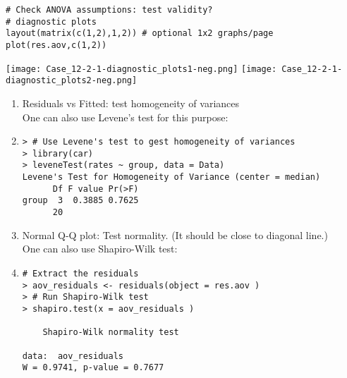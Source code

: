 \begin{frame}[fragile]
\begin{center}
\begin{lstlisting}
# Check ANOVA assumptions: test validity?
# diagnostic plots
layout(matrix(c(1,2),1,2)) # optional 1x2 graphs/page
plot(res.aov,c(1,2))
\end{lstlisting}
\vfill
\texttt{[image: Case\_12-2-1-diagnostic\_plots1-neg.png]}
\texttt{[image: Case\_12-2-1-diagnostic\_plots2-neg.png]}
\end{center}
\end{frame}
\begin{frame}[fragile]

	\begin{enumerate}
		\item Residuals vs Fitted: test homogeneity of variances\\
			One can also use Levene's test for this purpose:
		\item[]
			\begin{minipage}{0.7\textwidth}
\begin{lstlisting}
> # Use Levene's test to gest homogeneity of variances
> library(car)
> leveneTest(rates ~ group, data = Data)
Levene's Test for Homogeneity of Variance (center = median)
      Df F value Pr(>F)
group  3  0.3885 0.7625
      20
\end{lstlisting}
			\end{minipage}
\vfill
\item Normal Q-Q plot: Test normality. (It should be close to diagonal line.)\\
One can also use Shapiro-Wilk test:
\item[]
	\begin{minipage}{0.70\textwidth}
\begin{lstlisting}
# Extract the residuals
> aov_residuals <- residuals(object = res.aov )
> # Run Shapiro-Wilk test
> shapiro.test(x = aov_residuals )

	Shapiro-Wilk normality test

data:  aov_residuals
W = 0.9741, p-value = 0.7677
\end{lstlisting}
	\end{minipage}
	\end{enumerate}
\end{frame}
